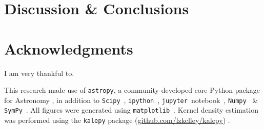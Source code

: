 


\section{Discussion \& Conclusions}
    \label{sec:disc}






\section*{Acknowledgments}
	I am very thankful to.

    This research made use of \texttt{astropy}, a community-developed core Python package for Astronomy \citep{astropy2013}, in addition to \texttt{Scipy}~\citep{scipy}, \texttt{ipython}~\citep{ipython}, \texttt{jupyter}~notebook~\citep{jupyter}, \texttt{Numpy}~\citep{numpy2011} \& \texttt{SymPy}~\citep{sympy2017}.  All figures were generated using \texttt{matplotlib}~\citep{matplotlib2007}.  Kernel density estimation was performed using the \texttt{kalepy}{} package (\href{https://github.com/lzkelley/kalepy}{github.com/lzkelley/kalepy}) \citep{kalepy2020}.


